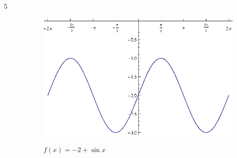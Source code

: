 \documentclass{exam}
\begin{document}
\begin{description}
      \item[5]
        \begin{figure}[H]
          \centering
          \includegraphics[scale=0.8]{exercise05.eps}

          $f(x) = -2 + \sin x$
        \end{figure}










\end{description}
\end{document}
